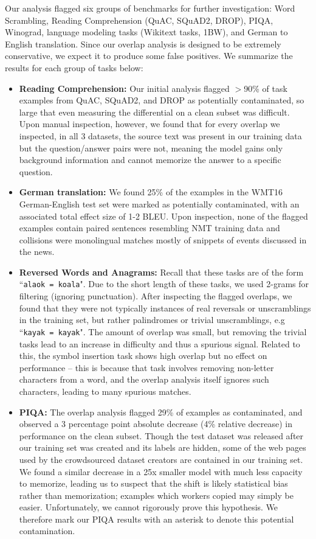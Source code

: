 \documentclass{article}
\begin{document}
Our analysis flagged six groups of benchmarks for further investigation: Word Scrambling, Reading Comprehension (QuAC, SQuAD2, DROP), PIQA, Winograd, language modeling tasks (Wikitext tasks, 1BW), and German to English translation. Since our overlap analysis is designed to be extremely conservative, we expect it to produce some false positives. We summarize the results for each group of tasks below:
\begin{itemize}
    \item \textbf{Reading Comprehension:} Our initial analysis flagged $>$90\% of task examples from QuAC, SQuAD2, and DROP as potentially contaminated, so large that even measuring the differential on a clean subset was difficult. Upon manual inspection, however, we found that for every overlap we inspected, in all 3 datasets, the source text was present in our training data but the question/answer pairs were not, meaning the model gains only background information and cannot memorize the answer to a specific question.
    \item \textbf{German translation:} We found 25\% of the examples in the WMT16 German-English test set were marked as potentially contaminated, with an associated total effect size of 1-2 BLEU.  Upon inspection, none of the flagged examples contain paired sentences resembling NMT training data and collisions were monolingual matches mostly of snippets of events discussed in the news.
    \item \textbf{Reversed Words and Anagrams:} Recall that these tasks are of the form ``\texttt{alaok = koala}". Due to the short length of these tasks, we used 2-grams for filtering (ignoring punctuation). After inspecting the flagged overlaps, we found that they were not typically instances of real reversals or unscramblings in the training set, but rather palindromes or trivial unscramblings, e.g ``\texttt{kayak = kayak}". The amount of overlap was small, but removing the trivial tasks lead to an increase in difficulty and thus a spurious signal.  Related to this, the symbol insertion task shows high overlap but no effect on performance -- this is because that task involves removing non-letter characters from a word, and the overlap analysis itself ignores such characters, leading to many spurious matches.
    \item \textbf{PIQA:} The overlap analysis flagged 29\% of examples as contaminated, and observed a 3 percentage point absolute decrease (4\% relative decrease) in performance on the clean subset. Though the test dataset was released after our training set was created and its labels are hidden, some of the web pages used by the crowdsourced dataset creators are contained in our training set. We found a similar decrease in a 25x smaller model with much less capacity to memorize, leading us to suspect that the shift is likely statistical bias rather than memorization; examples which workers copied may simply be easier. Unfortunately, we cannot rigorously prove this hypothesis.  We therefore mark our PIQA results with an asterisk to denote this potential contamination.

\end{itemize}
\end{document}
